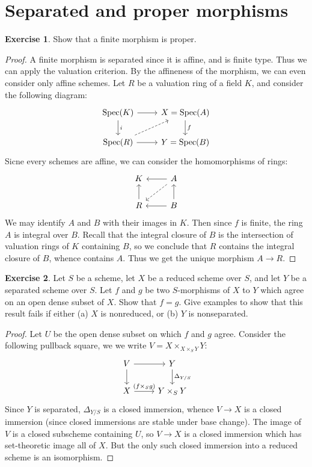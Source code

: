 \documentclass[11pt]{book}
\theoremstyle{definition}
\newtheorem{exercise}{Exercise}[section]
\begin{document}
\section{Separated and proper morphisms}
\begin{exercise}
Show that a finite morphism is proper.
\end{exercise}
\begin{proof}
A finite morphism is separated since it is affine, and is finite type. Thus we can apply the valuation criterion. By the affineness of the morphism, we can even consider only affine schemes. Let $R$ be a valuation ring of a field $K$, and consider the following diagram:
\[\begin{tikzcd}
\Spec(K)\ar[r]\ar[d,"i"]&X=\Spec(A)\ar[d,"f"]\\
\Spec(R)\ar[r]\ar[ru,dashed]&Y=\Spec(B)
\end{tikzcd}\]
Sicne every schemes are affine, we can consider the homomorphisms of rings:
\[\begin{tikzcd}
K&A\ar[l]\ar[ld,dashed]\\
R\ar[u]&B\ar[l]\ar[u]
\end{tikzcd}\]
We may identify $A$ and $B$ with their images in $K$. Then since $f$ is finite, the ring $A$ is integral over $B$. Recall that the integral closure of $B$ is the intersection of valuation rings of $K$ containing $B$, so we conclude that $R$ contains the integral closure of $B$, whence contains $A$. Thus we get the unique morphism $A\to R$.
\end{proof}
\begin{exercise}
Let $S$ be a scheme, let $X$ be a reduced scheme over $S$, and let $Y$ be a separated scheme over $S$. Let $f$ and $g$ be two $S$-morphisms of $X$ to $Y$ which agree on an open dense subset of $X$. Show that $f=g$. Give examples to show that this result fails if either (a) $X$ is nonreduced, or (b) $Y$ is nonseparated.
\end{exercise}
\begin{proof}
Let $U$ be the open dense subset on which $f$ and $g$ agree. Consider the following pullback square, we we write $V=X\times_{X\times_SY}Y$:
\[\begin{tikzcd}
V\ar[r]\ar[d]&Y\ar[d,"\Delta_{Y/S}"]\\
X\ar[r,"(f\times_Sg)"]&Y\times_SY
\end{tikzcd}\]
Since $Y$ is separated, $\Delta_{Y/S}$ is a closed immersion, whence $V\to X$ is a closed immersion (since closed immersions are stable under base change). The image of $V$ is a closed subscheme containing $U$, so $V\to X$ is a closed immersion which has set-theoretic image all of $X$. But the only such closed immersion into a reduced scheme is an isomorphism.
\end{proof}
\end{document}

